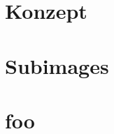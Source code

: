 \section{Konzept}
\label{sec:subimage_konzept}

\section{Subimages}
\label{sec:subimages}

\section{foo}
\label{sec:subimage_foo}